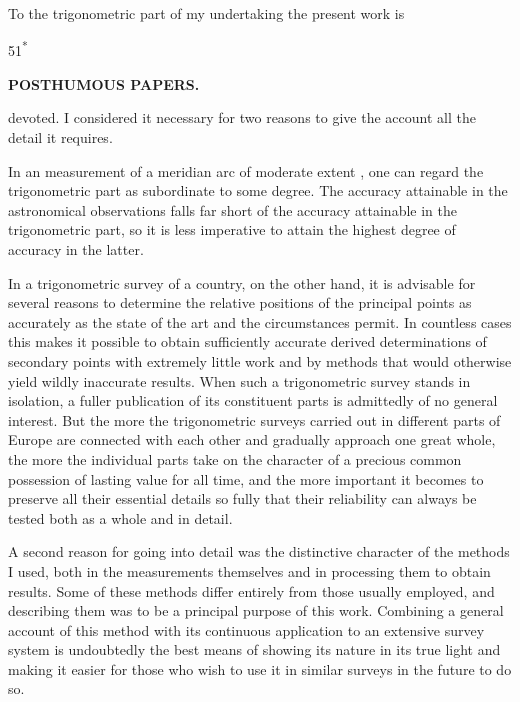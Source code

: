 \par\noindent\hspace*{\parindent}To the trigonometric part of my undertaking the present work is
\par\smallskip
\noindent\hfill{\small 51\textsuperscript{*}}\hspace*{.122\linewidth}\par\clearpage

\noindent{}\hfill{\small\textbf{POSTHUMOUS PAPERS.}}\hfill\null\par\medskip
\noindent devoted. I considered it necessary for two reasons to give the account
all the detail it requires.

\par\noindent\hspace*{\parindent}In an  measurement of a meridian arc of moderate extent
, one can regard the
trigonometric part as subordinate to some degree. The accuracy attainable in
the astronomical observations falls far short of the accuracy attainable in
the trigonometric part, so it is less imperative to attain the highest degree
of accuracy in the latter.

\par\noindent\hspace*{\parindent}In a trigonometric survey of a country, on the other hand, it is advisable
for several reasons to determine the relative positions of the principal points
as accurately as the state of the art and the circumstances permit. In countless
cases this makes it possible to obtain sufficiently accurate derived determinations
of secondary points with extremely little work and by methods that would
otherwise yield wildly inaccurate results. When such a trigonometric survey
stands in isolation, a fuller publication of its constituent parts is admittedly
of no general interest. But the more the trigonometric surveys carried out in
different parts of Europe are connected with each other and gradually approach
one great whole, the more the individual parts take on the character of a
precious common possession of lasting value for all time, and the more
important it becomes to preserve all their essential details so fully that their
reliability can always be tested both as a whole and in detail.

\par\noindent\hspace*{\parindent}A second reason for going into detail was the distinctive character
of the methods I used, both in the measurements themselves and in processing
them to obtain results. Some of these methods differ entirely from those
usually employed, and describing them was to be a principal purpose of this
work. Combining a general account of this method with its continuous application
to an extensive survey system is undoubtedly the best means of showing
its nature in its true light and making it easier for those who wish to use it
in similar surveys in the future to do so.
\par\clearpage

